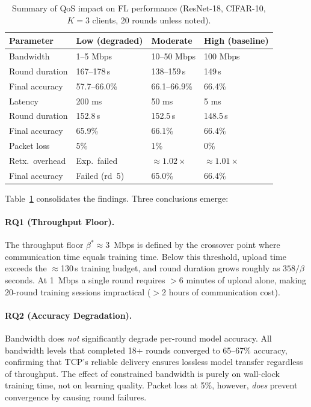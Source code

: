 \documentclass[12pt,a4paper]{report}
\begin{document}
\begin{table}[H]
\centering
\caption{Summary of QoS impact on FL performance (ResNet-18, CIFAR-10,
  $K=3$ clients, 20 rounds unless noted).}
\label{tab:summary_qos}
\begin{tabular}{llll}
\toprule
Parameter & Low (degraded) & Moderate & High (baseline) \\
\midrule
Bandwidth & 1--5 Mbps & 10--50 Mbps & 100 Mbps \\
Round duration & 167--178\,s & 138--159\,s & 149\,s \\
Final accuracy & 57.7--66.0\% & 66.1--66.9\% & 66.4\% \\
\midrule
Latency & 200 ms & 50 ms & 5 ms \\
Round duration & 152.8\,s & 152.5\,s & 148.5\,s \\
Final accuracy & 65.9\% & 66.1\% & 66.4\% \\
\midrule
Packet loss & 5\% & 1\% & 0\% \\
Retx.\ overhead & Exp.\ failed & $\approx 1.02\times$ & $\approx 1.01\times$ \\
Final accuracy & Failed (rd~5) & 65.0\% & 66.4\% \\
\bottomrule
\end{tabular}
\end{table}

Table~\ref{tab:summary_qos} consolidates the findings.  Three conclusions
emerge:

\paragraph{RQ1 (Throughput Floor).}  The throughput floor
$\beta^* \approx 3$~Mbps is defined by the crossover point where
communication time equals training time.  Below this threshold, upload
time exceeds the $\approx$130\,s training budget, and round duration
grows roughly as $358/\beta$ seconds.  At 1~Mbps a single round requires
$>$6 minutes of upload alone, making 20-round training sessions
impractical ($>$2 hours of communication cost).

\paragraph{RQ2 (Accuracy Degradation).}  Bandwidth does \emph{not}
significantly degrade per-round model accuracy.  All bandwidth levels that
completed 18+ rounds converged to 65--67\% accuracy, confirming that
TCP's reliable delivery ensures lossless model transfer regardless of
throughput.  The effect of constrained bandwidth is purely on wall-clock
training time, not on learning quality.  Packet loss at 5\%, however,
\emph{does} prevent convergence by causing round failures.
\end{document}
